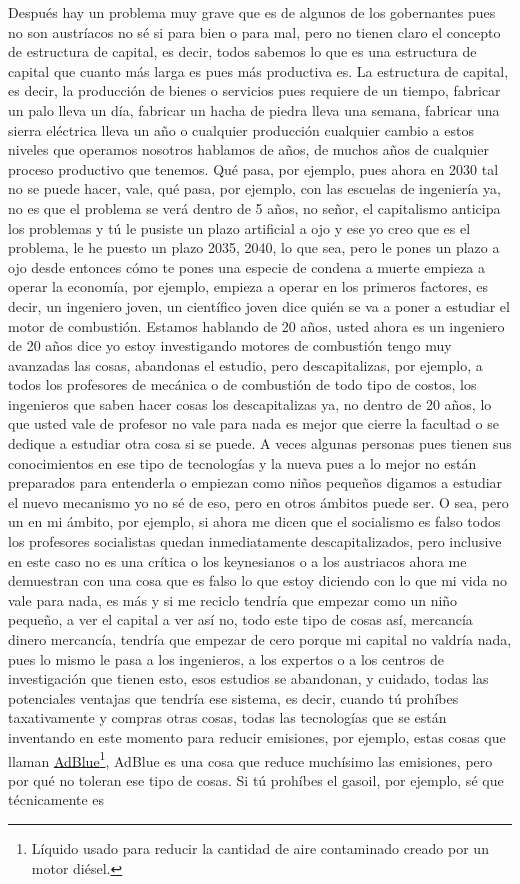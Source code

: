 Después hay un problema muy grave que es de algunos de los gobernantes pues no son austríacos no sé si para bien o para mal, pero no tienen claro el concepto de estructura de capital, es decir, todos sabemos lo que es una estructura de capital que cuanto más larga es pues más productiva es. La estructura de capital, es decir, la producción de bienes o servicios pues requiere de un tiempo, fabricar un palo lleva un día, fabricar un hacha de piedra lleva una semana, fabricar una sierra eléctrica lleva un año o cualquier producción cualquier cambio a estos niveles que operamos nosotros hablamos de años, de muchos años de cualquier proceso productivo que tenemos.  Qué pasa, por ejemplo, pues ahora en 2030 tal no se puede hacer, vale, qué pasa, por ejemplo, con las escuelas de ingeniería ya, no es que el problema se verá dentro de 5 años, no señor, el capitalismo anticipa los problemas y tú le pusiste un plazo artificial a ojo y ese yo creo que es el problema, le he puesto un plazo 2035, 2040, lo que sea, pero le pones un plazo a ojo desde entonces cómo te pones una especie de condena a muerte empieza a operar la economía, por ejemplo, empieza a operar en los primeros factores, es decir, un ingeniero joven, un científico joven dice quién se va a poner a estudiar el motor de combustión. Estamos hablando de 20 años, usted ahora es un ingeniero de 20 años dice yo estoy investigando motores de combustión tengo muy avanzadas las cosas, abandonas el estudio, pero descapitalizas, por ejemplo, a todos los profesores de mecánica o de combustión de todo tipo de costos, los ingenieros que saben hacer cosas los descapitalizas ya, no dentro de 20 años, lo que usted vale de profesor no vale para nada es mejor que cierre la facultad o se dedique a estudiar otra cosa si se puede. A veces algunas personas pues tienen sus conocimientos en ese tipo de tecnologías y la nueva pues a lo mejor no están preparados para entenderla o empiezan como niños pequeños digamos a estudiar el nuevo mecanismo yo no sé de eso, pero en otros ámbitos puede ser. O sea, pero un en mi ámbito, por ejemplo, si ahora me dicen que el socialismo es falso todos los profesores socialistas quedan inmediatamente descapitalizados, pero inclusive en este caso no es una crítica o los keynesianos o a los austriacos ahora me demuestran con una cosa que es falso lo que estoy diciendo con lo que mi vida no vale para nada, es más y si me reciclo tendría que empezar como un niño pequeño, a ver el capital a ver así no, todo este tipo de cosas así, mercancía dinero mercancía, tendría que empezar de cero porque mi capital no valdría nada, pues lo mismo le pasa a los ingenieros, a los expertos o a los centros de investigación que tienen esto, esos estudios se abandonan, y cuidado, todas las potenciales ventajas que tendría ese sistema, es decir, cuando tú prohíbes taxativamente y compras otras cosas, todas las tecnologías que se están inventando en este momento para reducir emisiones, por ejemplo, estas cosas que llaman \href{https://en.wikipedia.org/wiki/Diesel_exhaust_fluid}{AdBlue}\footnote{Líquido usado para reducir la cantidad de aire contaminado creado por un motor diésel.}, AdBlue es una cosa que reduce muchísimo las emisiones, pero por qué no toleran ese tipo de cosas. Si tú prohíbes el gasoil, por ejemplo, sé que técnicamente es 